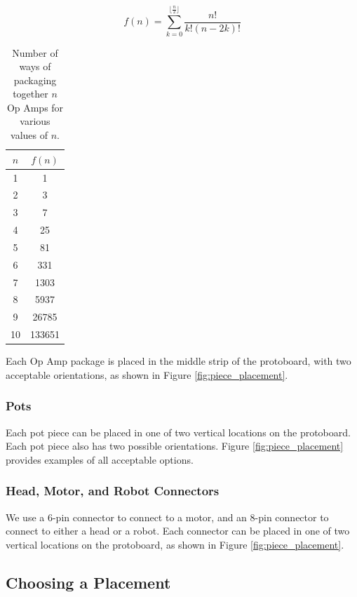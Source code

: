 \begin{equation}
f(n) = \sum\limits_{k=0}^{\lfloor\frac{n}{2}\rfloor}{\frac{n!}{k!(n - 2k)!}}
\label{eq:opamp}
\end{equation}

\begin{table}
\begin{center}
\begin{singlespace}
\begin{tabular}{c | c}
$n$ & $f(n)$ \\
\hline
\hline
1 & 1 \\
2 & 3 \\
3 & 7 \\
4 & 25 \\
5 & 81 \\
6 & 331 \\
7 & 1303 \\
8 & 5937 \\
9 & 26785 \\
10 & 133651
\end{tabular}
\end{singlespace}
\end{center}
\label{tb:opamp}
\caption{Number of ways of packaging together $n$ Op Amps for various values of
$n$.}
\end{table}

Each Op Amp package is placed in the middle strip of the protoboard, with two
acceptable orientations, as shown in Figure \ref{fig:piece_placement}.

\subsubsection{Pots}

Each pot piece can be placed in one of two vertical locations on the protoboard.
Each pot piece also has two possible orientations. Figure
\ref{fig:piece_placement} provides examples of all acceptable options.

\subsubsection{Head, Motor, and Robot Connectors}

We use a 6-pin connector to connect to a motor, and an 8-pin connector to
connect to either a head or a robot. Each connector can be placed in one of two
vertical locations on the protoboard, as shown in Figure
\ref{fig:piece_placement}.

\subsection{Choosing a Placement}

